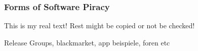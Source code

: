 \subsubsection{Forms of Software Piracy} \label{subsubsection:foundation-piracy-overview-forms}
This is my real text! Rest might be copied or not be checked!


Release Groups, blackmarket, app beispiele, foren etc\newline
